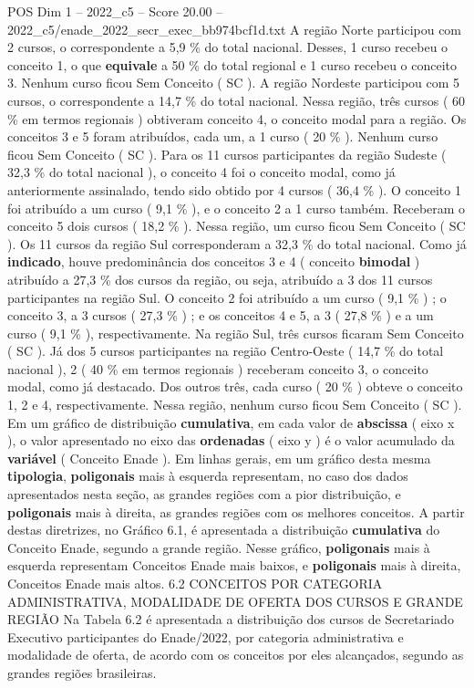 \begin{textsample}{POS Dim 1 – 2022\_c5 – Score 20.00 – 2022\_c5/enade\_2022\_secr\_exec\_bb974bcf1d.txt}
A região Norte participou com 2 cursos, o correspondente a 5,9 \% do total nacional.
Desses, 1 curso recebeu o conceito 1, o que \textbf{equivale} a 50 \% do total regional e 1 curso recebeu o conceito 3.
Nenhum curso ficou Sem Conceito ( SC ).
A região Nordeste participou com 5 cursos, o correspondente a 14,7 \% do total nacional.
Nessa região, três cursos ( 60 \% em termos regionais ) obtiveram conceito 4, o conceito modal para a região.
Os conceitos 3 e 5 foram atribuídos, cada um, a 1 curso ( 20 \% ).
Nenhum curso ficou Sem Conceito ( SC ).
Para os 11 cursos participantes da região Sudeste ( 32,3 \% do total nacional ), o conceito 4 foi o conceito modal, como já anteriormente assinalado, tendo sido obtido por 4 cursos ( 36,4 \% ).
O conceito 1 foi atribuído a um curso ( 9,1 \% ), e o conceito 2 a 1 curso também.
Receberam o conceito 5 dois cursos ( 18,2 \% ).
Nessa região, um curso ficou Sem Conceito ( SC ).
Os 11 cursos da região Sul corresponderam a 32,3 \% do total nacional.
Como já \textbf{indicado}, houve predominância dos conceitos 3 e 4 ( conceito \textbf{bimodal} ) atribuído a 27,3 \% dos cursos da região, ou seja, atribuído a 3 dos 11 cursos participantes na região Sul.
O conceito 2 foi atribuído a um curso ( 9,1 \% ) ; o conceito 3, a 3 cursos ( 27,3 \% ) ; e os conceitos 4 e 5, a 3 ( 27,8 \% ) e a um curso ( 9,1 \% ), respectivamente.
Na região Sul, três cursos ficaram Sem Conceito ( SC ).
Já dos 5 cursos participantes na região Centro-Oeste ( 14,7 \% do total nacional ), 2 ( 40 \% em termos regionais ) receberam conceito 3, o conceito modal, como já destacado.
Dos outros três, cada curso ( 20 \% ) obteve o conceito 1, 2 e 4, respectivamente.
Nessa região, nenhum curso ficou Sem Conceito ( SC ).
Em um gráfico de distribuição \textbf{cumulativa}, em cada valor de \textbf{abscissa} ( eixo x ), o valor apresentado no eixo das \textbf{ordenadas} ( eixo y ) é o valor acumulado da \textbf{variável} ( Conceito Enade ).
Em linhas gerais, em um gráfico desta mesma \textbf{tipologia}, \textbf{poligonais} mais à esquerda representam, no caso dos dados apresentados nesta seção, as grandes regiões com a pior distribuição, e \textbf{poligonais} mais à direita, as grandes regiões com os melhores conceitos.
A partir destas diretrizes, no Gráfico 6.1, é apresentada a distribuição \textbf{cumulativa} do Conceito Enade, segundo a grande região.
Nesse gráfico, \textbf{poligonais} mais à esquerda representam Conceitos Enade mais baixos, e \textbf{poligonais} mais à direita, Conceitos Enade mais altos. 6.2 CONCEITOS POR CATEGORIA ADMINISTRATIVA, MODALIDADE DE OFERTA DOS CURSOS E GRANDE REGIÃO Na Tabela 6.2 é apresentada a distribuição dos cursos de Secretariado Executivo participantes do Enade/2022, por categoria administrativa e modalidade de oferta, de acordo com os conceitos por eles alcançados, segundo as grandes regiões brasileiras.

\end{textsample}
